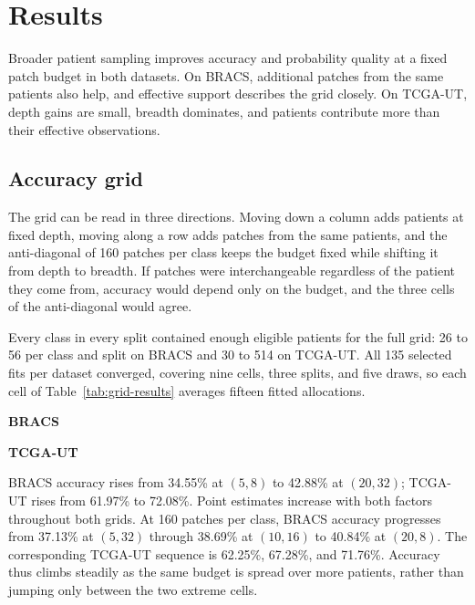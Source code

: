 \section{Results}
\label{sec:results}
Broader patient sampling improves accuracy and probability quality at a fixed patch budget in both datasets. On BRACS, additional patches from the same patients also help, and effective support describes the grid closely. On TCGA-UT, depth gains are small, breadth dominates, and patients contribute more than their effective observations.

\subsection{Accuracy grid}
The grid can be read in three directions. Moving down a column adds patients at fixed depth, moving along a row adds patches from the same patients, and the anti-diagonal of 160 patches per class keeps the budget fixed while shifting it from depth to breadth. If patches were interchangeable regardless of the patient they come from, accuracy would depend only on the budget, and the three cells of the anti-diagonal would agree.

Every class in every split contained enough eligible patients for the full grid: 26 to 56 per class and split on BRACS and 30 to 514 on TCGA-UT. All 135 selected fits per dataset converged, covering nine cells, three splits, and five draws, so each cell of Table~\ref{tab:grid-results} averages fifteen fitted allocations.

\begin{table}[htbp]
\centering\small
\textbf{BRACS}\par\smallskip

\par\medskip
\textbf{TCGA-UT}\par\smallskip

\caption{Accuracy rises with both factors, but faster down the columns (more patients) than along the rows (more patches per patient), most clearly on TCGA-UT. Entries are patient-macro balanced accuracy (\%) with paired-bootstrap 95\% intervals; $G$ denotes patients per class and $m$ patches per patient. Scores average splits and draws equally, and intervals condition on the realized training allocations.}
\label{tab:grid-results}
\end{table}

\noindent BRACS accuracy rises from 34.55\% at $(5,8)$ to 42.88\% at $(20,32)$; TCGA-UT rises from 61.97\% to 72.08\%. Point estimates increase with both factors throughout both grids. At 160 patches per class, BRACS accuracy progresses from 37.13\% at $(5,32)$ through 38.69\% at $(10,16)$ to 40.84\% at $(20,8)$. The corresponding TCGA-UT sequence is 62.25\%, 67.28\%, and 71.76\%. Accuracy thus climbs steadily as the same budget is spread over more patients, rather than jumping only between the two extreme cells.


